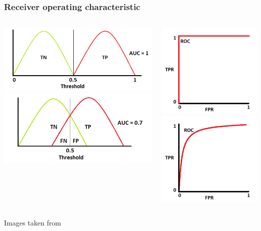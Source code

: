 \documentclass[compress]{beamer}
\begin{document}
\begin{frame}
\frametitle{Receiver operating characteristic}
\begin{columns}
\begin{center}
\includegraphics[width=1\linewidth]{Pic/ROC/ROC_A.png}
\includegraphics[width=1\linewidth]{Pic/ROC/ROC_B.png}\\
\end{center}
\begin{center}
\includegraphics[width=0.5\linewidth]{Pic/ROC/ROC_A_R.png}
\includegraphics[width=0.5\linewidth]{Pic/ROC/ROC_B_R.png}\\
\end{center}
\end{columns}
\begin{center}
Images taken from \cite{ROC_fig}
\end{center}
\end{frame}
\end{document}
